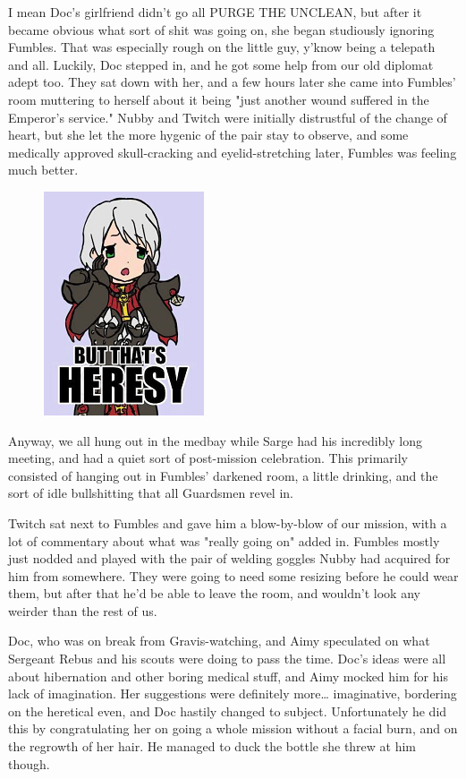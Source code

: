 I mean Doc's girlfriend didn't go all PURGE THE UNCLEAN, but after it became obvious what sort of shit was going on, she began studiously ignoring Fumbles. 
That was especially rough on the little guy, y'know being a telepath and all. 
Luckily, Doc stepped in, and he got some help from our old diplomat adept too. 
They sat down with her, and a few hours later she came into Fumbles' room muttering to herself about it being "just another wound suffered in the Emperor's service." Nubby and Twitch were initially distrustful of the change of heart, but she let the more hygenic of the pair stay to observe, and some medically approved skull-cracking and eyelid-stretching later, Fumbles was feeling much better.
\begin{figure}
	\begin{center}
		\includegraphics[width=\figwidth]{pics/12/79.png}
	\end{center}
\end{figure}
Anyway, we all hung out in the medbay while Sarge had his incredibly long meeting, and had a quiet sort of post-mission celebration. 
This primarily consisted of hanging out in Fumbles' darkened room, a little drinking, and the sort of idle bullshitting that all Guardsmen revel in.

Twitch sat next to Fumbles and gave him a blow-by-blow of our mission, with a lot of commentary about what was "really going on" added in. 
Fumbles mostly just nodded and played with the pair of welding goggles Nubby had acquired for him from somewhere. 
They were going to need some resizing before he could wear them, but after that he'd be able to leave the room, and wouldn't look any weirder than the rest of us.

Doc, who was on break from Gravis-watching, and Aimy speculated on what Sergeant Rebus and his scouts were doing to pass the time. 
Doc's ideas were all about hibernation and other boring medical stuff, and Aimy mocked him for his lack of imagination. 
Her suggestions were definitely more… imaginative, bordering on the heretical even, and Doc hastily changed to subject. 
Unfortunately he did this by congratulating her on going a whole mission without a facial burn, and on the regrowth of her hair. 
He managed to duck the bottle she threw at him though.

